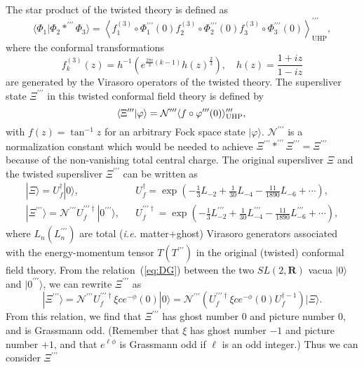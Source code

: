 \documentclass[a4paper,12pt]{article}
\newcommand{\cN}{\mathcal{N}}
\newcommand{\aaru}{\mathbf{R}}
\newcommand{\tp}{\prime\prime\prime}
\begin{document}
The star product of the twisted theory is defined as 
\begin{equation}
\langle\Phi_1|\Phi_2*^{\tp}\Phi_3\rangle=\left\langle f_1^{(3)}\circ\Phi_1^{\tp}(0)f_2^{(3)}
\circ\Phi_2^{\tp}(0)f_3^{(3)}\circ\Phi_3^{\tp}(0)\right\rangle^{\tp}_{\mathrm{UHP}}, \label{eq:EB}
\end{equation}
where the conformal transformations 
\[ f^{(3)}_k(z)=h^{-1}\left(e^{\frac{2\pi i}{3}(k-1)}h(z)^{\frac{2}{3}}\right), \quad h(z)=
\frac{1+iz}{1-iz} \]
are generated by the Virasoro operators of the twisted theory. 
The supersliver state $\Xi^{\tp}$ in this twisted conformal field theory is defined by 
\begin{equation}
\langle\Xi^{\tp}|\varphi\rangle=\cN^{\tp}\langle f\circ\varphi^{\tp}(0)\rangle^{\tp}_{\mathrm{UHP}}, 
\label{eq:GA} \\
\end{equation}
with $f(z)=\tan^{-1}z$ for an arbitrary Fock space state $|\varphi\rangle$. $\cN^{\tp}$ is a normalization 
constant which would be needed to achieve $\Xi^{\tp}*^{\tp}\Xi^{\tp}=\Xi^{\tp}$ because of the 
non-vanishing total central charge. The original supersliver $\Xi$ and the twisted supersliver 
$\Xi^{\tp}$ can be written as~\cite{RZ,Wedge}
\begin{eqnarray}
|\Xi\rangle=U_f^{\dagger}|0\rangle, & & U_f^{\dagger}=\exp\left(-\frac{1}{3}L_{-2}+\frac{1}{30}
L_{-4}-\frac{11}{1890}L_{-6}+\cdots\right), \label{eq:GD} \\
|\Xi^{\tp}\rangle=\cN^{\tp}U_f^{\tp\dagger}|0^{\tp}\rangle, & & U_f^{\tp\dagger}=\exp\left(
-\frac{1}{3}L^{\tp}_{-2}+\frac{1}{30}L^{\tp}_{-4}-\frac{11}{1890}L^{\tp}_{-6}+\cdots\right), \label{eq:GE}
\end{eqnarray}
where $L_n (L_n^{\tp})$ are total (\textit{i.e.} matter+ghost) Virasoro generators associated with 
the energy-momentum tensor $T (T^{\tp})$ in the original (twisted) conformal field theory. 
From the relation~(\ref{eq:DG}) between the two $SL(2,\aaru)$ vacua $|0\rangle$ and $|0^{\tp}\rangle$, 
we can rewrite $\Xi^{\tp}$ as 
\begin{equation}
|\Xi^{\tp}\rangle=\cN^{\tp}U_f^{\tp\dagger}\xi ce^{-\phi}(0)|0\rangle =\cN^{\tp}
\left( U_f^{\tp\dagger}\xi ce^{-\phi}(0)U_f^{\dagger -1}\right)|\Xi\rangle . \label{eq:GF}
\end{equation}
From this relation, we find that $\Xi^{\tp}$ has ghost number 0 and picture number 0, and 
is Grassmann odd. (Remember that $\xi$ has ghost number $-1$ and picture number $+1$, and that 
$e^{\ell\phi}$ is Grassmann odd if $\ell$ is an odd integer.) Thus we can consider $\Xi^{\tp}$ 
\end{document}
